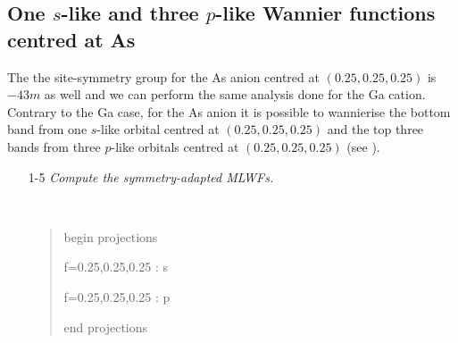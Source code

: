 \clearpage

\subsection*{One $s$-like and three $p$-like Wannier functions centred at As}

The the site-symmetry group for the As anion centred at $(0.25,0.25,0.25)$ is ${-}43m$ as well and we can perform the same analysis done for the Ga cation. Contrary to the Ga case, for the As anion it is possible to wannierise the bottom band from one $s$-like orbital centred at $(0.25,0.25,0.25)$ and the top three bands from three $p$-like orbitals centred at $(0.25,0.25,0.25)$ (see ).

\begin{itemize}
	\item[1-5] {\it Compute the symmetry-adapted MLWFs.}

{\tt
\begin{quote}
begin projections

f=0.25,0.25,0.25 : s

f=0.25,0.25,0.25 : p

end projections
\end{quote}
}



\end{itemize}
